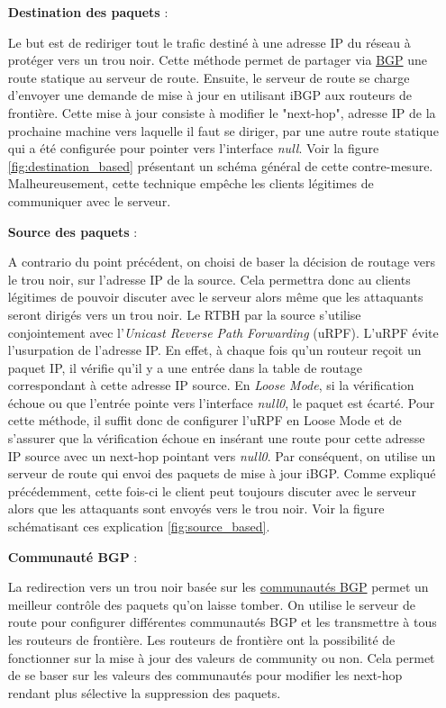\begin{itemize}
    \item [\textbf{Destination des paquets}] : 
    
    Le but est de rediriger tout le trafic destiné à une adresse IP du réseau à protéger vers un trou noir. Cette méthode permet de partager via \hyperref[sec:BGP]{BGP} une route statique au serveur de route. Ensuite, le serveur de route se charge d'envoyer une demande de mise à jour en utilisant iBGP aux routeurs de frontière. Cette mise à jour consiste à modifier le "next-hop", adresse IP de la prochaine machine vers laquelle il faut se diriger, par une autre route statique qui a été configurée pour pointer vers l'interface \textit{null}. Voir la figure \ref{fig:destination_based} présentant un schéma général de cette contre-mesure. Malheureusement, cette technique empêche les clients légitimes de communiquer avec le serveur.\newline

    \item [\textbf{Source des paquets}] : 
    
    A contrario du point précédent, on choisi de baser la décision de routage vers le trou noir, sur l'adresse IP de la source. Cela permettra donc au clients légitimes de pouvoir discuter avec le serveur alors même que les attaquants seront dirigés vers un trou noir. Le RTBH par la source s'utilise conjointement avec l'\textit{Unicast Reverse Path Forwarding} (uRPF). L'uRPF évite l'usurpation de l'adresse IP. En effet, à chaque fois qu'un routeur reçoit un paquet IP, il vérifie qu'il y a une entrée dans la table de routage correspondant à cette adresse IP source. En \textit{Loose Mode}, si la vérification échoue ou que l'entrée pointe vers l'interface \textit{null0}, le paquet est écarté. Pour cette méthode, il suffit donc de configurer l'uRPF en Loose Mode et de s'assurer que la vérification échoue en insérant une route pour cette adresse IP source avec un next-hop pointant vers \textit{null0}. Par conséquent, on utilise un serveur de route qui envoi des paquets de mise à jour iBGP. Comme expliqué précédemment, cette fois-ci le client peut toujours discuter avec le serveur alors que les attaquants sont envoyés vers le trou noir. Voir la figure schématisant ces explication \ref{fig:source_based}.\newline
    
    \item [\textbf{Communauté BGP}] : 
    
    La redirection vers un trou noir basée sur les \hyperref[sec:BGP]{communautés BGP} permet un meilleur contrôle des paquets qu'on laisse tomber. On utilise le serveur de route pour configurer différentes communautés BGP et les transmettre à tous les routeurs de frontière. Les routeurs de frontière ont la possibilité de fonctionner sur la mise à jour des valeurs de community ou non. Cela permet de se baser sur les valeurs des communautés pour modifier les next-hop rendant plus sélective la suppression des paquets.
\end{itemize}

